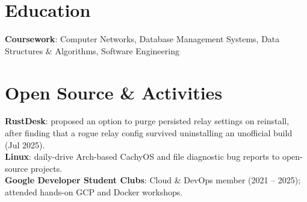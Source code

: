 \documentclass[a4paper]{article}
\begin{document}
\section{Education}
  \resumeSubHeadingListStart
    \eduGNIT
  \resumeSubHeadingListEnd
\vspace{-8pt}
\begin{resumeBlock}
\textbf{Coursework}{: Computer Networks, Database Management Systems, Data Structures \& Algorithms, Software Engineering}
\end{resumeBlock}
\vspace{-6pt}

\section{Open Source \& Activities}
\begin{resumeBlock}
\textbf{RustDesk}{: proposed an option to purge persisted relay settings on reinstall, after finding that a rogue relay config survived uninstalling an unofficial build (Jul 2025).} \\
\textbf{Linux}{: daily-drive Arch-based CachyOS and file diagnostic bug reports to open-source projects.} \\
\textbf{Google Developer Student Clubs}{: Cloud \& DevOps member (2021 -- 2025); attended hands-on GCP and Docker workshops.}
\end{resumeBlock}
\end{document}
